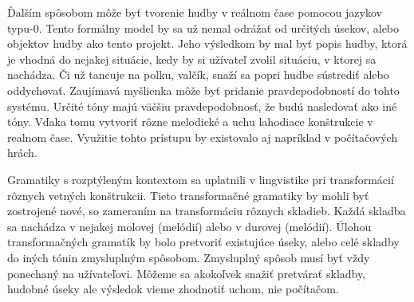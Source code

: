 Ďalším spôsobom môže byť tvorenie hudby v reálnom čase pomocou jazykov typu-0. Tento formálny model by sa už nemal odrážať od určitých úsekov, alebo objektov hudby ako tento projekt. Jeho výsledkom by mal byť popis hudby, ktorá je vhodná do nejakej situácie, kedy by si užívateľ zvolil situáciu, v ktorej sa nachádza. Či už tancuje na polku, valčík, snaží sa popri hudbe sústrediť alebo oddychovať. Zaujímavá myšlienka môže byť pridanie pravdepodobností do tohto systému. Určité tóny majú väčšiu pravdepodobnosť, že budú nasledovať ako iné tóny. Vďaka tomu vytvoriť rôzne melodické a uchu lahodiace konštrukcie v realnom čase. Využitie tohto prístupu by existovalo aj napríklad v počítačových hrách. 

Gramatiky s rozptýleným kontextom sa uplatnili v lingvistike pri transformácií rôznych vetných konštrukcii. Tieto transformačné gramatiky by mohli byť zostrojené nové, so zameraním na transformáciu rôznych skladieb. Každá skladba sa nachádza v nejakej molovej (melódií) alebo v durovej (melódií). Úlohou transformačných gramatík by bolo pretvoriť existujúce úseky, alebo celé skladby do iných tónin zmysluplným spôsobom. Zmysluplný spôsob musí byť vždy ponechaný na užívateľovi. Môžeme sa akokoľvek snažiť pretvárať skladby, hudobné úseky ale výsledok vieme zhodnotiť uchom, nie počítačom.




